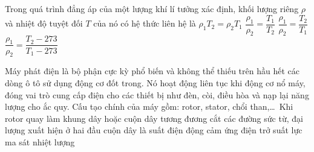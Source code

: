 	\begin{ex}%
		Trong quá trình đẳng áp của một lượng khí lí tưởng xác định, khối lượng riêng $\rho$ và nhiệt độ tuyệt đối $T$ của nó có hệ thức liên hệ là
		\choice
		{$\rho_1T_2=\rho_2T_1$}
		{$\dfrac{\rho_1}{\rho_2}=\dfrac{T_1}{T_2}$}
		{\True $\dfrac{\rho_1}{\rho_2}=\dfrac{T_2}{T_1}$}
		{$\dfrac{\rho_1}{\rho_2}=\dfrac{T_2-273}{T_1-273}$}
	\end{ex}

	\begin{ex}%
		Máy phát điện là bộ phận cực kỳ phổ biến và không thể thiếu trên hầu hết các dòng ô tô sử dụng động cơ đốt trong. Nó hoạt động liên tục khi động cơ nổ máy, đóng vai trò cung cấp điện cho các thiết bị như đèn, còi, điều hòa và nạp lại năng lượng cho ắc quy. Cấu tạo chính của máy gồm: rotor, stator, chổi than,\ldots\ Khi rotor quay làm khung dây hoặc cuộn dây tương đương cắt các đường sức từ, đại lượng xuất hiện ở hai đầu cuộn dây là
		\choice
		{\True suất điện động cảm ứng}
		{điện trở suất}
		{lực ma sát}
		{nhiệt lượng}
	\end{ex}

